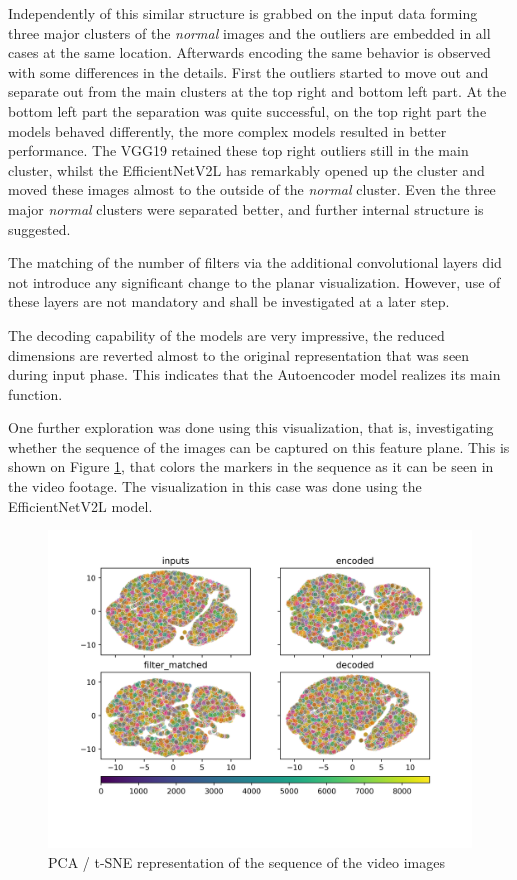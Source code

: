 Independently of this similar structure is grabbed on the input data forming three major clusters
of the \emph{normal} images and the outliers are embedded in all cases at the same location.
Afterwards encoding the same behavior is observed with some differences in the details.
First the outliers started to move out and separate out from the main clusters at the top right
and bottom left part.
At the bottom left part the separation was quite successful, on the top right part the models behaved
differently, the more complex models resulted in better performance.
The VGG19 retained these top right outliers still in the main cluster, whilst the EfficientNetV2L
has remarkably opened up the cluster and moved these images almost to the outside of the \emph{normal}
cluster.
Even the three major \emph{normal} clusters were separated better, and further internal structure is
suggested.

The matching of the number of filters via the additional convolutional layers did not introduce any
significant change to the planar visualization.
However, use of these layers are not mandatory and shall be investigated at a later step.

The decoding capability of the models are very impressive, the reduced dimensions are reverted
almost to the original representation that was seen during input phase.
This indicates that the Autoencoder model realizes its main function.

One further exploration was done using this visualization, that is, investigating whether the sequence
of the images can be captured on this feature plane.
This is shown on Figure \ref{fig:efficientnetv2l_pca2},
that colors the markers in the sequence as it can be seen in the video footage.
The visualization in this case was done using the EfficientNetV2L model.

\begin{figure}[!ht]
    \centering
    \includegraphics[width=\textwidth,trim={0 1cm 0 1cm},clip]{./results/efficientnetv2l_vgg19/20230525_194238_feature_vectors_2.png}
    \caption{PCA / t-SNE representation of the sequence of the video images}
    \label{fig:efficientnetv2l_pca2}
\end{figure}

